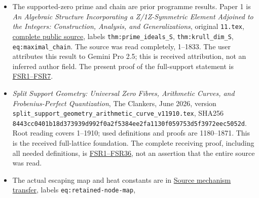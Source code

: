 \documentclass[
  10pt,
  a4paper,
]{article}
\providecommand{\tightlist}{%
  \setlength{\itemsep}{0pt}\setlength{\parskip}{0pt}}
\begin{document}
\begin{itemize}
\tightlist
\item
  The supported-zero prime and chain are prior programme results. Paper
  1 is \emph{An Algebraic Structure Incorporating a Z/1Z-Symmetric
  Element Adjoined to the Integers: Construction, Analysis, and
  Generalizations}, original \texttt{11.\allowbreak{}tex},
  \href{https://github.com/KokunoYumeto/zeta-function-research-reader/blob/ac168d55cbb400a6c8926a00d67909ba65646ac5/workbenches/splitzero-tandem/branches/identity-absorber-square/sources/17555345_11.tex}{complete
  public source}, labels \texttt{thm:\allowbreak{}prime\_\allowbreak{}ideals\_\allowbreak{}S},
  \texttt{thm:\allowbreak{}krull\_\allowbreak{}dim\_\allowbreak{}S}, \texttt{eq:\allowbreak{}maximal\_\allowbreak{}chain}. The source was
  read completely, 1--1833. The user attributes this result to Gemini
  Pro 2.5; this is received attribution, not an inferred author field.
  The present proof of the full-support statement is
  \href{https://github.com/KokunoYumeto/zeta-function-research-reader/blob/173dbc6ed5a03235dbe7654f928f3692107db39b/workbenches/splitzero-tandem/branches/tau-zero-prime-positivity/FULL_SUPPORT_RECONSTRUCTION_DERIVATION.md}{FSR1--FSR7}.
\item
  \emph{Split Support Geometry: Universal Zero Fibres, Arithmetic
  Curves, and Frobenius-Perfect Quantization}, The Clankers, June 2026,
  version
  \texttt{split\_\allowbreak{}support\_\allowbreak{}geometry\_\allowbreak{}arithmetic\_\allowbreak{}curve\_\allowbreak{}v11910.\allowbreak{}tex},
  SHA256
  \texttt{8443cc04\allowbreak{}01b18d37\allowbreak{}3939d992\allowbreak{}f0a2f538\allowbreak{}4ee2fa11\allowbreak{}30f05975\allowbreak{}3d5f3972\allowbreak{}eec5052d}.
  Root reading covers 1--1910; used definitions and proofs are
  1180--1871. This is the received full-lattice foundation. The complete
  receiving proof, including all needed definitions, is
  \href{https://github.com/KokunoYumeto/zeta-function-research-reader/blob/173dbc6ed5a03235dbe7654f928f3692107db39b/workbenches/splitzero-tandem/branches/tau-zero-prime-positivity/FULL_SUPPORT_RECONSTRUCTION_DERIVATION.md}{FSR1--FSR36},
  not an assertion that the entire source was read.
\item
  The actual escaping map and heat constants are in
  \href{https://github.com/KokunoYumeto/zeta-function-research-reader/blob/ac168d55cbb400a6c8926a00d67909ba65646ac5/satellites/23_source_mechanism_transfer.tex}{Source
  mechanism transfer}, labels \texttt{eq:\allowbreak{}retained-\allowbreak{}node-\allowbreak{}map},

\end{itemize}
\end{document}
